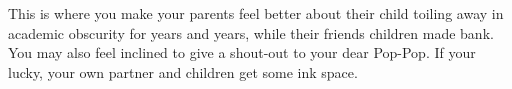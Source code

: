 This is where you make your parents feel better about their child toiling away in academic obscurity for years and years, while their friends children made bank. You may also feel inclined to give a shout-out to your dear Pop-Pop. If your lucky, your own partner and children get some ink space. 

